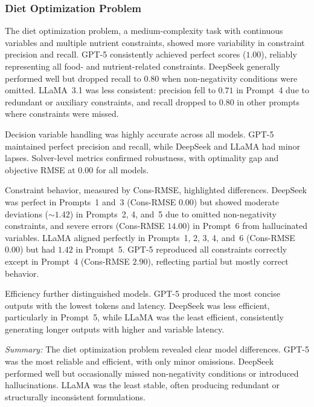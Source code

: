\documentclass[review,12pt]{elsarticle}
\begin{document}


\subsubsection{Diet Optimization Problem} 

The diet optimization problem, a medium-complexity task with continuous variables and multiple nutrient constraints, showed more variability in constraint precision and recall. GPT-5 consistently achieved perfect scores ($1.00$), reliably representing all food- and nutrient-related constraints. DeepSeek generally performed well but dropped recall to $0.80$ when non-negativity conditions were omitted. LLaMA~3.1 was less consistent: precision fell to $0.71$ in Prompt~4 due to redundant or auxiliary constraints, and recall dropped to $0.80$ in other prompts where constraints were missed.

Decision variable handling was highly accurate across all models. GPT-5 maintained perfect precision and recall, while DeepSeek and LLaMA had minor lapses. Solver-level metrics confirmed robustness, with optimality gap and objective RMSE at $0.00$ for all models.

Constraint behavior, measured by Cons-RMSE, highlighted differences. DeepSeek was perfect in Prompts~1 and~3 (Cons-RMSE $0.00$) but showed moderate deviations ($\sim1.42$) in Prompts~2, 4, and~5 due to omitted non-negativity constraints, and severe errors (Cons-RMSE $14.00$) in Prompt~6 from hallucinated variables. LLaMA aligned perfectly in Prompts~1, 2, 3, 4, and~6 (Cons-RMSE $0.00$) but had $1.42$ in Prompt~5. GPT-5 reproduced all constraints correctly except in Prompt~4 (Cons-RMSE $2.90$), reflecting partial but mostly correct behavior.

Efficiency further distinguished models. GPT-5 produced the most concise outputs with the lowest tokens and latency. DeepSeek was less efficient, particularly in Prompt~5, while LLaMA was the least efficient, consistently generating longer outputs with higher and variable latency.

\textit{Summary:} The diet optimization problem revealed clear model differences. GPT-5 was the most reliable and efficient, with only minor omissions. DeepSeek performed well but occasionally missed non-negativity conditions or introduced hallucinations. LLaMA was the least stable, often producing redundant or structurally inconsistent formulations.
\end{document}
